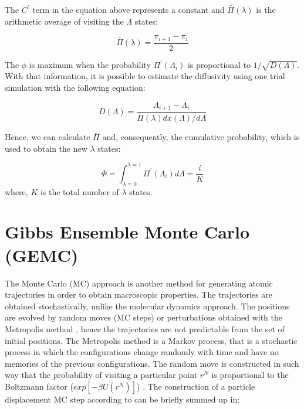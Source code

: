 	The $C^{'} $ term in the equation above represents a constant and $\bar{\Pi} (\lambda)$ is the arithmetic average of visiting the $\Lambda$ states:
	
	\begin{equation}
	\bar{\Pi} (\lambda) = \dfrac{\pi_{i+1} - \pi_{i}}{2}
	\label{eqn:barplambda}
	\end{equation}
	
	The $\phi$ is maximum when the probability $\Pi^{'}(\Lambda_{i})$ is proportional to $1/\sqrt{D(\Lambda)}$. With that information, it is possible to estimate the diffusivity using one trial simulation with the following equation:
	
	\begin{equation}
	D(\Lambda) = \dfrac{\Lambda_{i+1} - \Lambda_{i}}{\bar{\Pi} (\lambda) {dx(\Lambda)}/{d \Lambda}}
	\label{eqn:diff}
	\end{equation}
	
	Hence, we can calculate $\bar{\Pi} $ and, consequently, the cumulative probability, which is used to obtain the new $\lambda$ states:
	
	\begin{equation}
	\Phi = \int_{\lambda =0}^{\lambda =1} \Pi^{'}(\Lambda_{i}) d \Lambda = \dfrac{i}{K}
	\label{eqn:cumfun}
	\end{equation}
	where, $K$ is the total number of $\lambda$ states. 
	
\section{Gibbs Ensemble Monte Carlo (GEMC)}\label{gemc}
	
	The Monte Carlo (MC) approach is another method for generating atomic trajectories in order to obtain macroscopic properties. The trajectories are obtained stochastically, unlike the molecular dynamics approach. The positions are evolved by random moves (MC steps) or perturbations obtained with the Metropolis method \cite{1953JChPh..21.1087M}, hence the trajectories are not predictable from the set of initial positions. The Metropolis method is a Markov process, that is a stochastic process in which the configurations change randomly with time and have no memories of the previous configurations. The random move is constructed in such way that the probability of visiting a particular point $r^{N}$ is proportional to the Boltzmann factor ($exp[-\beta U(r^{N})]$) \cite{frenkel}. The construction of a  particle displacement MC step according to  can be briefly summed up in:
	
